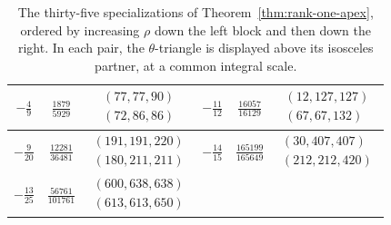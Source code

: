 \documentclass[11pt]{amsart}
\theoremstyle{plain}
\theoremstyle{remark}
\theoremstyle{plain}
\begin{document}
\begin{table}[H]
\begin{tabular}{c|c|c||c|c|c}
$-\frac{4}{9}$ &
$\frac{1879}{5929}$ &
$\begin{array}{c}
(77,77,90)\\
(72,86,86)
\end{array}$
&
$-\frac{11}{12}$ &
$\frac{16057}{16129}$ &
$\begin{array}{c}
(12,127,127)\\
(67,67,132)
\end{array}$
\\
\hline

$-\frac{9}{20}$ &
$\frac{12281}{36481}$ &
$\begin{array}{c}
(191,191,220)\\
(180,211,211)
\end{array}$
&
$-\frac{14}{15}$ &
$\frac{165199}{165649}$ &
$\begin{array}{c}
(30,407,407)\\
(212,212,420)
\end{array}$
\\
\hline

$-\frac{13}{25}$ &
$\frac{56761}{101761}$ &
$\begin{array}{c}
(600,638,638)\\
(613,613,650)
\end{array}$
&
& &
\\
\hline

\end{tabular}

\caption{The thirty-five specializations of
Theorem~\ref{thm:rank-one-apex}, ordered by increasing $\rho$ down the
left block and then down the right. In each pair, the $\theta$-triangle
is displayed above its isosceles partner, at a common integral scale.}
\label{tab:rank-one-apex}
\end{table}
\end{document}
